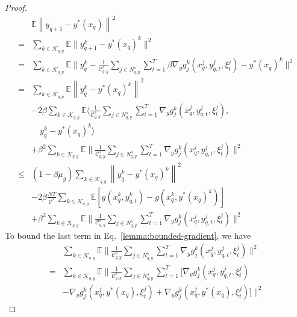 \documentclass[lettersize,journal]{IEEEtran}
\begin{document}
\begin{proof}
\begin{align}
    &\mathbb{E} \left\|y_{q+1}-y^*(x_q)\right\|^2
    \nonumber
    \\
    =&\sum_{k\in \mathcal{K}_{q,y}}\mathbb{E}\|y_{q+1}^k-y^*(x_q)^k\|^2 
    \nonumber 
    \\
    =& \sum_{k\in \mathcal{K}_{q,y}}\mathbb{E}\|y_{q}^k-\frac{1}{\mathcal{C}^{s}_{q,y}}\sum_{j\in N^{s}_{q,y}}\sum_{t=1}^T\beta \nabla_y g^k_j(x_{q}^j,y_{q,t}^j,\xi_t^j)-y^*(x_q)^k\|^2 
    \nonumber
    \\
    =&\sum_{k\in \mathcal{K}_{q,y}}\mathbb{E}\left\|y_{q}^k-y^*(x_q)^k\right\|^2\nonumber\\&-2\beta\sum_{k\in \mathcal{K}_{q,y}}\mathbb{E}\langle \frac{1}{\mathcal{C}^{s}_{q,y}}\sum_{j\in N^{s}_{q,y}}\sum_{t=1}^T \nabla_y g^k_j(x_{q}^j,y_{q,t}^j,\xi_t^j),\nonumber\\&\quad y_{q}^k-y^*(x_q)^k\rangle\nonumber\\
    &+\beta^2\sum_{k\in \mathcal{K}_{q,y}}\mathbb{E}\|\frac{1}{\mathcal{C}^{s}_{q,y}}\sum_{j\in N^{s}_{q,y}}\sum_{t=1}^T \nabla_y g^k_j(x_{q}^j,y_{q,t}^j,\xi_t^j)\|^2
    \nonumber
    \\
    \leq& (1-\beta\mu_g)\sum_{k\in \mathcal{K}_{q,y}}\left\|y_{q}^k-y^*(x_q)^k\right\|^2\label{lemma:bounded-gradient}\\&-2\beta\frac{NT}{\mathcal{C}^*} \sum_{k\in \mathcal{K}_{q,y}}\mathbb{E}\left[g(x_q^k,y_{q,t}^k)-g(x_q^k,y^*(x_q)^k)\right]\nonumber\\
    &+\beta^2\sum_{k\in \mathcal{K}_{q,y}}\mathbb{E}\|\frac{1}{\mathcal{C}^{s}_{q,y}}\sum_{j\in N^{s}_{q,y}}\sum_{t=1}^T \nabla_y g^k_j(x_{q}^j,y_{q,t}^j,\xi_t^j)\|^2\nonumber
\end{align}
To bound the last term in Eq.~\ref{lemma:bounded-gradient}, we have
\begin{align}
    &\sum_{k\in \mathcal{K}_{q,y}}\mathbb{E}\|\frac{1}{\mathcal{C}^{s}_{q,y}}\sum_{j\in N^{s}_{q,y}}\sum_{t=1}^T \nabla_y g^k_j(x_{q}^j,y_{q,t}^j,\xi_t^j)\|^2
    \nonumber
    \\
    =&\sum_{k\in \mathcal{K}_{q,y}}\mathbb{E}\|\frac{1}{\mathcal{C}^{s}_{q,y}}\sum_{j\in N^{s}_{q,y}}\sum_{t=1}^T[ \nabla_y g^k_j(x_{q}^j,y_{q,t}^j,\xi_t^j)\nonumber\\&-\nabla_y g^k_j(x_{q}^j,y^*(x_{q}),\xi_t^j)+\nabla_y g^k_j(x_{q}^j,y^*(x_{q}),\xi_t^j)]\|^2
    \nonumber

\end{align}
\end{proof}
\end{document}
